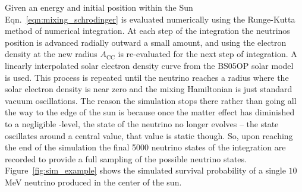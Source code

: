 Given an energy and initial position within the Sun
Eqn.~\eqref{eqn:mixing_schrodinger}
is evaluated numerically using the Runge-Kutta method of numerical integration.
At each step of the integration the neutrinos position is advanced radially
outward a small amount, and using the electron density at the new radius
$A_{\mathrm{CC}}$ is re-evaluated for the next step of integration.
A linearly interpolated solar electron density curve from the BS05OP solar model~\citep{bs_ssm} is used.
This process is repeated until the neutrino reaches a radius where
the solar electron density is near zero and the mixing Hamiltonian is
just standard vacuum oscillations.
The reason the simulation stops there rather than going all the way to the
edge of the sun is because once the matter effect has diminished to a negligible
-level, the state of the neutrino no longer evolves -- the state oscillates
around a central value, that value is static though.
So, upon reaching the end of the simulation the final 5000 neutrino states of the
integration are recorded to provide a full sampling of the possible
neutrino states.
Figure~\ref{fig:sim_example} shows the simulated survival probability of a single
$10$\,MeV neutrino produced in the center of the sun.


